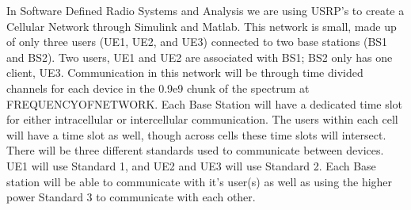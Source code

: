 
In Software Defined Radio Systems and Analysis we are using USRP's to create a Cellular Network through Simulink and Matlab. This network is small, made up of only three users (UE1, UE2, and UE3) connected to two base stations (BS1 and BS2). Two users,  UE1 and UE2 are associated with BS1; BS2 only has one client, UE3. Communication in this network will be through time divided channels for each device in the 0.9e9 chunk of the spectrum at FREQUENCYOFNETWORK. Each Base Station will have a dedicated time slot for either intracellular or intercellular communication. The users within each cell will have a time slot as well, though across cells these time slots will intersect. There will be three different standards used to communicate between devices. UE1 will use Standard 1, and UE2 and UE3 will use Standard 2. Each Base station will be able to communicate with it's user(s) as well as using the higher power Standard 3 to communicate with each other.



